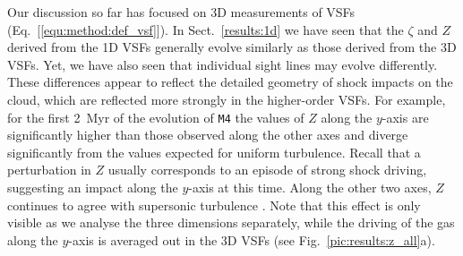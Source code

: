            Our discussion so far has focused on 3D measurements of VSFs
(Eq.~[\ref{equ:method:def_vsf}]).
% 
%
In Sect.~\ref{results:1d} we have seen that the $\zeta$ and $Z$ derived from the 1D VSFs generally evolve similarly as those derived from the 3D VSFs.
Yet, we have also seen that individual sight lines may evolve differently.
    These differences appear to reflect the detailed geometry of shock impacts on the cloud, 
     which are reflected more strongly in the higher-order VSFs.
%
For example, for the first 2~Myr of the evolution of \texttt{M4} the values of $Z$ along the $y$-axis are significantly higher than those observed along the other axes 
    and diverge significantly from the values expected for uniform turbulence.
Recall that a perturbation in $Z$ usually corresponds to an episode of strong 
     shock driving, suggesting an impact along the $y$-axis at this time. 
     Along the other two axes, $Z$ continues to agree with supersonic turbulence 
     \citep{Boldyrev2002}.
Note that this effect is only visible as we analyse the three dimensions separately, while the driving of the gas along the $y$-axis is averaged out in the 3D VSFs (see Fig.~\ref{pic:results:z_all}a).

